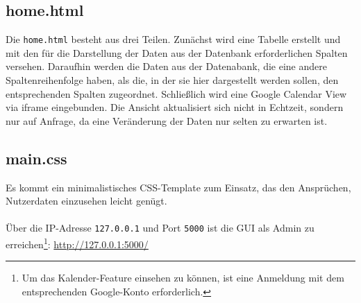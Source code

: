         \subsection{home.html} \label{Implementierung: home.html}
            Die \verb|home.html| besteht aus drei Teilen. Zunächst wird eine Tabelle erstellt und mit den für die Darstellung der Daten aus der Datenbank erforderlichen Spalten versehen. Daraufhin werden die Daten aus der Datenabank, die eine andere Spaltenreihenfolge haben, als die, in der sie hier dargestellt werden sollen, den entsprechenden Spalten zugeordnet.
            Schließlich wird eine Google Calendar View via iframe eingebunden.
            Die Ansicht aktualisiert sich nicht in Echtzeit, sondern nur auf Anfrage, da eine Veränderung der Daten nur selten zu erwarten ist.

        \subsection{main.css} \label{Implementierung: main.css}
            Es kommt ein minimalistisches CSS-Template zum Einsatz, das den Ansprüchen, Nutzerdaten einzusehen leicht genügt.\\ \\

        Über die IP-Adresse \verb|127.0.0.1| und Port \verb|5000| ist die GUI als Admin zu erreichen\footnote{Um das Kalender-Feature einsehen zu können, ist eine Anmeldung mit dem entsprechenden Google-Konto erforderlich.}: \url{http://127.0.0.1:5000/} 


